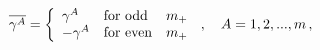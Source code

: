 \begin{equation}
\overline{\gamma^{A}}=\left\{
\begin{array}{lll}
\gamma^{A}& {\rm for~ odd}& m_{+}\\ 
-\gamma^{A}& {\rm for~ even}& m_{+}   
\end{array}\right.\,,\quad  A=1,2,...,m\,, 
\end{equation} 
